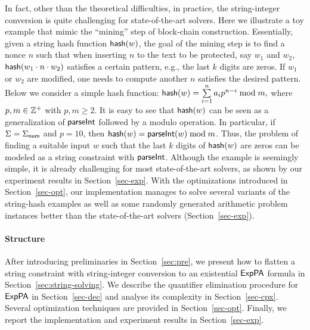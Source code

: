 In fact, other than the theoretical difficulties, in practice, the string-integer conversion is quite challenging for state-of-the-art solvers. 
Here we illustrate a toy example that mimic the ``mining'' step of block-chain construction. 
Essentially, given a string hash function ${\sf hash}(w)$, the goal of the mining step is to find a nonce $n$ such that when inserting $n$ to the text to be protected, say $w_1$ and $w_2$, ${\sf hash}(w_1\cdot n\cdot w_2)$ satisfies a certain pattern, e.g., the last $k$ digits are zeros. 
If $w_1$ or $w_2$ are modified, one needs to compute another $n$ satisfies the desired pattern.
Below we consider a simple hash function:
${\sf hash}(w) = \sum \limits_{i = 1}^n a_i p^{n-i} \bmod m,$
where $p, m \in \mathbb{Z}^+$ with $p, m \ge 2$. 
It is easy to see that ${\sf hash}(w)$ can be seen as a generalization of $\textsf{parseInt}$ followed by a modulo operation. 
In particular, if $\Sigma = \Sigma_{\sf num}$ and $p = 10$, then ${\sf hash}(w) = \textsf{parseInt}(w) \bmod m$. Thus, the problem of finding a suitable input $w$ such that the last $k$ digits of ${\sf hash}(w)$ are zeros can be modeled as a string constraint with $\textsf{parseInt}$. Although the example is seemingly simple, it is already challenging for most state-of-the-art solvers, as shown by our experiment results in Section~\ref{sec-exp}. 
With the optimizations introduced in Section~\ref{sec-opt}, 
our implementation manages to solve several variants of the string-hash examples as well as some randomly generated arithmetic problem instances better than the state-of-the-art solvers (Section~\ref{sec-exp}). 
 
\paragraph*{Structure}
After introducing preliminaries in Section~\ref{sec:pre}, we present how to flatten a string constraint with string-integer conversion to an existential ${\sf ExpPA}$ formula in Section~\ref{sec:string-solving}. We describe the quantifier elimination procedure for ${\sf ExpPA}$ in Section~\ref{sec-dec} and analyse its complexity in Section~\ref{sec-cpx}. Several optimization techniques are provided in Section~\ref{sec-opt}. Finally, we report the implementation and experiment results in Section~\ref{sec-exp}.


